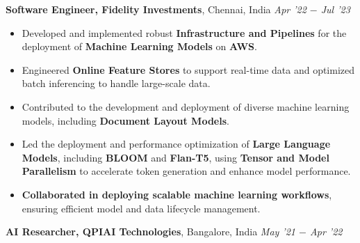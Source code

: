 \documentclass[10pt,a4]{article}
\begin{document}
{\begin{flushleft}
    \vspace{0.5mm}
    \hspace{1.5mm} \textbf{\large Software Engineer, Fidelity Investments},  Chennai, India \hfill \textit{\large Apr '22 $-$ Jul '23}	\\
    \begin{itemize}
        \item Developed and implemented robust \textbf{Infrastructure and Pipelines} for the deployment of \textbf{Machine Learning Models} on \textbf{AWS}.  
         \item Engineered \textbf{Online Feature Stores} to support real-time data and optimized batch inferencing to handle large-scale data.
         \item Contributed to the development and deployment of diverse machine learning models, including \textbf{Document Layout Models}.
         \item Led the deployment and performance optimization of \textbf{Large Language Models}, including \textbf{BLOOM} and \textbf{Flan-T5}, using \textbf{Tensor and Model Parallelism} to accelerate token generation and enhance model performance.
        \item \textbf{Collaborated in deploying scalable machine learning workflows}, ensuring efficient model and data lifecycle management.
    \end{itemize}	

    \vspace{0.5mm}
    \hspace{1.5mm} \textbf{\large AI Researcher, QPIAI Technologies},  Bangalore, India \hfill \textit{\large May '21 $-$ Apr '22}	\\
    \begin{itemize}
          

\end{itemize}
\end{flushleft}}
\end{document}
